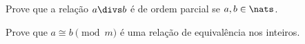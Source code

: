\begin{exercise}
Prove que a relação $a\divs b$ é de ordem parcial se $a,b\in\nats$.
\end{exercise}

\begin{exercise}
Prove que $a\cong b\pmod m$ é uma relação de equivalência nos inteiros.
\end{exercise}

